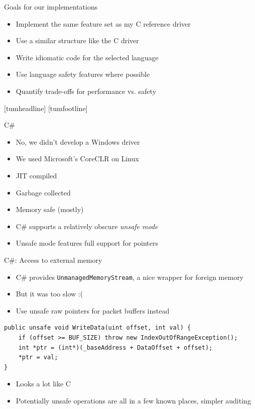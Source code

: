 \documentclass[NET,english,aspectratio=169,notitleframe]{tumbeamer}
\begin{document}
\begin{frame}{Goals for our implementations}
\begin{itemize}
\item Implement the same feature set as my C reference driver
\item Use a similar structure like the C driver
\item Write idiomatic code for the selected language
\item Use language safety features where possible
\item Quantify trade-offs for performance vs. safety
\end{itemize}
\end{frame}

[tumheadline]
[tumfootline]
\begin{frame}{}
\centering {}
\end{frame}


\begin{frame}{C\#}
\begin{itemize}
\item No, we didn't develop a Windows driver
\item We used Microsoft's CoreCLR on Linux
\pause
\vspace{1em}
\item JIT compiled
\item Garbage collected
\item Memory safe (mostly)
\pause
\vspace{1em}
\item C\# supports a relatively obscure \emph{unsafe mode}
\item Unsafe mode features full support for pointers
\end{itemize}
\end{frame}

\begin{frame}[fragile]{C\#: Access to external memory}
\begin{itemize}
\item C\# provides \texttt{UnmanagedMemoryStream}, a nice wrapper for foreign memory
\item But it was too slow :(
\pause
\item Use unsafe raw pointers for packet buffers instead
\end{itemize}
\begin{verbatim}
public unsafe void WriteData(uint offset, int val) {
    if (offset >= BUF_SIZE) throw new IndexOutOfRangeException();
    int *ptr = (int*)(_baseAddress + DataOffset + offset);
    *ptr = val;
}
\end{verbatim}
\begin{itemize}
\pause
\item Looks a lot like C
\item Potentially unsafe operations are all in a few known places, simpler auditing
\end{itemize}
\end{frame}
\end{document}
